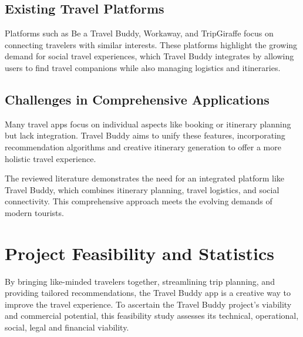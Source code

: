 \documentclass[12pt,a4paper]{report}
\begin{document}
\section{ Existing Travel Platforms}
Platforms such as Be a Travel Buddy, Workaway, and TripGiraffe focus on connecting travelers with similar interests. These platforms highlight the growing demand for social travel experiences, which Travel Buddy integrates by allowing users to find travel companions while also managing logistics and itineraries\cite{beatravelbuddy}\cite{workaway}\cite{tripgiraffe}.

\section{Challenges in Comprehensive Applications}
Many travel apps focus on individual aspects like booking or itinerary planning but lack integration. Travel Buddy aims to unify these features, incorporating recommendation algorithms and creative itinerary generation to offer a more holistic travel experience.


The reviewed literature demonstrates the need for an integrated platform like Travel Buddy, which combines itinerary planning, travel logistics, and social connectivity. This comprehensive approach meets the evolving demands of modern tourists.

\chapter{Project Feasibility  and Statistics}
By bringing like-minded travelers together, streamlining trip planning, and providing tailored recommendations, the Travel Buddy app is a creative way to improve the travel experience. To ascertain the Travel Buddy project's viability and commercial potential, this feasibility study assesses its technical, operational, social, legal and financial viability.
\end{document}
